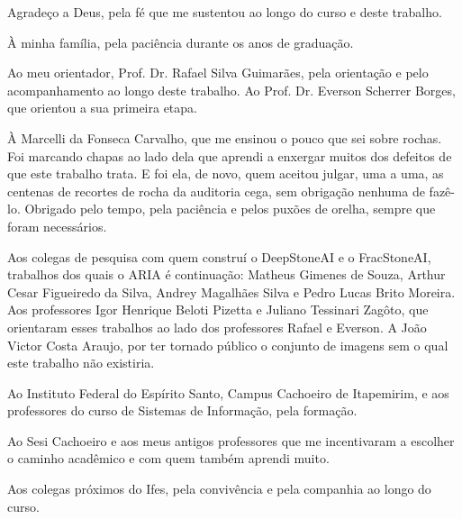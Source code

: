 Agradeço a Deus, pela fé que me sustentou ao longo do curso e deste trabalho.

À minha família, pela paciência durante os anos de graduação.

Ao meu orientador, Prof. Dr. Rafael Silva Guimarães, pela orientação e pelo acompanhamento ao longo deste trabalho. Ao Prof. Dr. Everson Scherrer Borges, que orientou a sua primeira etapa.

À Marcelli da Fonseca Carvalho, que me ensinou o pouco que sei sobre rochas. Foi marcando chapas ao lado dela que aprendi a enxergar muitos dos defeitos de que este trabalho trata. E foi ela, de novo, quem aceitou julgar, uma a uma, as centenas de recortes de rocha da auditoria cega, sem obrigação nenhuma de fazê-lo. Obrigado pelo tempo, pela paciência e pelos puxões de orelha, sempre que foram necessários.

Aos colegas de pesquisa com quem construí o DeepStoneAI e o FracStoneAI, trabalhos dos quais o ARIA é continuação: Matheus Gimenes de Souza, Arthur Cesar Figueiredo da Silva, Andrey Magalhães Silva e Pedro Lucas Brito Moreira. Aos professores Igor Henrique Beloti Pizetta e Juliano Tessinari Zagôto, que orientaram esses trabalhos ao lado dos professores Rafael e Everson. A João Victor Costa Araujo, por ter tornado público o conjunto de imagens sem o qual este trabalho não existiria.

Ao Instituto Federal do Espírito Santo, Campus Cachoeiro de Itapemirim, e aos professores do curso de Sistemas de Informação, pela formação.

Ao Sesi Cachoeiro e aos meus antigos professores que me incentivaram a escolher o caminho acadêmico e com quem também aprendi muito.

Aos colegas próximos do Ifes, pela convivência e pela companhia ao longo do curso.
